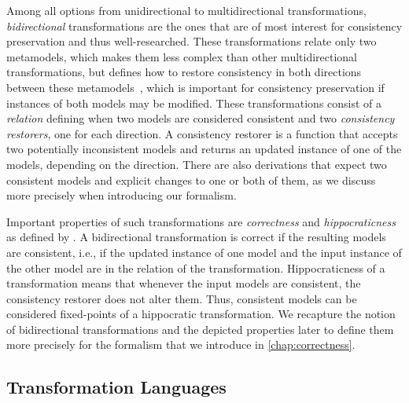 
Among all options from unidirectional to multidirectional transformations, \emph{bidirectional} transformations are the ones that are of most interest for consistency preservation and thus well-researched.
These transformations relate only two metamodels, which makes them less complex than other multidirectional transformations, but defines how to restore consistency in both directions between these metamodels~\cite{stevens2010sosym}, which is important for consistency preservation if instances of both models may be modified.
These transformations consist of a \emph{relation} defining when two models are considered consistent and two \emph{consistency restorers}, one for each direction.
A consistency restorer is a function that accepts two potentially inconsistent models and returns an updated instance of one of the models, depending on the direction.
There are also derivations that expect two consistent models and explicit changes to one or both of them, as we discuss more precisely when introducing our formalism.

Important properties of such transformations are \emph{correctness} and \emph{hippocraticness} as defined by \textcite{stevens2010sosym}.
A bidirectional transformation is correct if the resulting models are consistent, i.e., if the updated instance of one model and the input instance of the other model are in the relation of the transformation.
Hippocraticness of a transformation means that whenever the input models are consistent, the consistency restorer does not alter them.
Thus, consistent models can be considered fixed-points of a hippocratic transformation.
We recapture the notion of bidirectional transformations and the depicted properties later to define them more precisely for the formalism that we introduce in \autoref{chap:correctness}.




\subsection{Transformation Languages}
\label{chap:foundations:transformations:languages}

